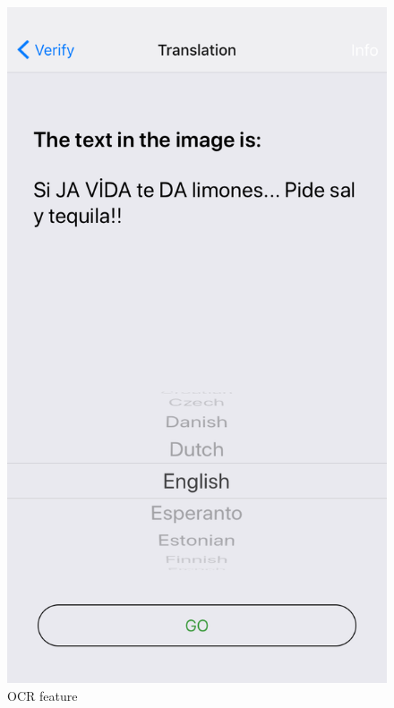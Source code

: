 \documentclass[12pt]{article}
\begin{document}
\begin{figure} [H]
\begin{minipage}{.5\textwidth}
  \includegraphics[width=0.9\linewidth]{media/case4a.png}
  \caption{OCR feature}
  \label{fig:case4}
\end{minipage}
\end{figure}
\end{document}
